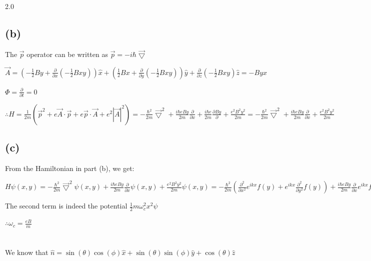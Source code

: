 \documentclass[12pt]{article}
\begin{document}
\begin{spacing}{2.0}
\subsection*{(b)}

The $\vec{p}$ operator can be written as $\vec{p} = -i\hbar \vec{\bigtriangledown}$

$\vec{A}= (-\frac{1}{2} By + \frac{\partial}{\partial x} (-\frac{1}{2} Bxy) )\hat{x}+ (\frac{1}{2} Bx + \frac{\partial}{\partial y} (-\frac{1}{2} Bxy)) \hat{y} + \frac{\partial}{\partial z} (-\frac{1}{2} Bxy) \hat{z}= -By \hat{x}$

$\Phi=\frac{\partial}{\partial t}=0$

$\therefore H=\frac{1}{2m} \left( \vec{p}^2 + e\vec{A}\cdot \vec{p} + e\vec{p}\cdot\vec{A} + e^2|\vec{A}|^2 \right)= -\frac{\hbar^2}{2m} \vec{\bigtriangledown}^2 + \frac{i\hbar eBy}{2m}\frac{\partial}{\partial x} + \frac{i\hbar e}{2m} \frac{\partial By}{\partial}  + \frac{e^2 B^2 y^2}{2m}= -\frac{\hbar^2}{2m} \vec{\bigtriangledown}^2 + \frac{i\hbar eBy}{2m}\frac{\partial}{\partial x}  +\frac{e^2 B^2 y^2}{2m}$

\subsection*{(c)}

From the Hamiltonian in part (b), we get:

$H\psi(x,y)= -\frac{\hbar^2}{2m} \vec{\bigtriangledown}^2 \psi(x,y) + \frac{i\hbar eBy}{2m}\frac{\partial}{\partial x} \psi(x,y) +\frac{e^2 B^2 y^2}{2m} \psi(x,y) = 
-\frac{\hbar^2}{2m}( \frac{\partial^2}{\partial x^2} e^{ikx} f(y) + e^{ikx} \frac{\partial^2}{\partial y^2}  f(y)) + \frac{i\hbar eBy}{2m}\frac{\partial}{\partial x} e^{ikx} f(y) + \frac{e^2 B^2 y^2}{2m} e^{ikx} f(y) =
 -\frac{\hbar^2}{2m}( -k^2 e^{ikx} f(y) + e^{ikx} f''(y)) - \frac{k\hbar eBy}{2m} e^{ikx} f(y) + \frac{e^2 B^2 y^2}{2m} e^{ikx} f(y) = -\frac{\hbar^2}{2m} \frac{\partial^2}{\partial y^2} \psi + \frac{1}{2} m \frac{e^2 B^2}{m^2} y^2\psi + \frac{\hbar^2 k^2 -k\hbar eBy}{2m} \psi $
 
 The second term is indeed the potential $\frac{1}{2} m \omega_c^2 x^2 \psi$
 
 $\therefore \boxed{\omega_c=\frac{eB}{m}}$

\section{} %

We know that $\hat{n}= \sin(\theta)\cos(\phi)\hat{x}+ \sin(\theta)\sin(\phi)\hat{y} + \cos(\theta)\hat{z}$


\end{spacing}
\end{document}
